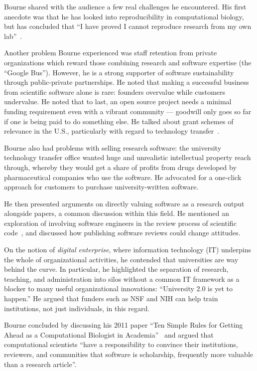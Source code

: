 \documentclass[11pt, oneside]{amsart}
\begin{document}
Bourne shared with the audience a few real challenges he
encountered. His first anecdote was that he has looked into
reproducibility in computational biology, but has concluded that ``I
have proved I cannot reproduce research from my own
lab''~\cite{Veretnik}.

Another problem Bourne experienced was staff retention from private
organizations which reward those combining research and software
expertise (the ``Google Bus''). However, he is a strong supporter of
software sustainability through public-private partnerships. He noted
that making a successful business from scientific software alone is
rare: founders overvalue while customers undervalue. He noted that to
last, an open source project needs a minimal funding requirement even
with a vibrant community --- goodwill only goes so far if one is being
paid to do something else.  He talked about grant schemes of relevance
in the U.S., particularly with regard to technology
transfer~\cite{sbir-web, fased-web}.

Bourne also had problems with selling research software: the
university technology transfer office wanted huge and unrealistic
intellectual property reach through, whereby they would get a share of
profits from drugs developed by pharmaceutical companies who use the
software.  He advocated for a one-click approach for customers to
purchase university-written software.

He then presented arguments on directly valuing software as a research
output alongside papers, a common discussion within this field.  He
mentioned an exploration of involving software engineers in the review
process of scientific code~\cite{peer-review-code}, and discussed how
publishing software reviews could change attitudes.

On the notion of \emph{digital enterprise}, where information
technology (IT) underpins the whole of organizational activities, he
contended that universities are way behind the curve. In particular,
he highlighted the separation of research, teaching, and
administration into silos without a common IT framework as a blocker
to many useful organizational innovations: ``University 2.0 is yet to
happen.''  He argued that funders such as NSF and NIH can help train
institutions, not just individuals, in this regard.

Bourne concluded by discussing his 2011 paper ``Ten Simple Rules for
Getting Ahead as a Computational Biologist in
Academia''~\cite{bourne_ten} and argued that computational scientists
``have a responsibility to convince their institutions, reviewers, and
communities that software is scholarship, frequently more valuable
than a research article''.
\end{document}
